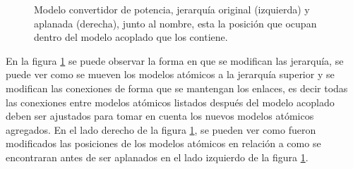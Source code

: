 \begin{figure}[H]
{\begin{minipage}[t][][b]{.59\textwidth}
        \end{minipage}%
}
        \caption{Modelo convertidor de potencia, jerarquía original (izquierda) y aplanada (derecha), junto al nombre, esta la posición que ocupan dentro del modelo acoplado que los contiene.}
        \label{fig:coupled-tree}
\end{figure}

	En la figura \ref{fig:coupled-tree} se puede observar la forma en que se modifican las jerarquía, se puede ver como se mueven los modelos atómicos 
        a la jerarquía superior y se modifican las conexiones de forma que se mantengan los enlaces, es decir todas las conexiones entre modelos atómicos 
        listados después del modelo acoplado deben ser ajustados para tomar en cuenta los nuevos modelos atómicos agregados. 
	En el lado derecho de la figura \ref{fig:coupled-tree}, se pueden ver como fueron modificados las posiciones de los modelos atómicos en relación a como se
	encontraran antes de ser aplanados en el lado izquierdo de la figura \ref{fig:coupled-tree}.

